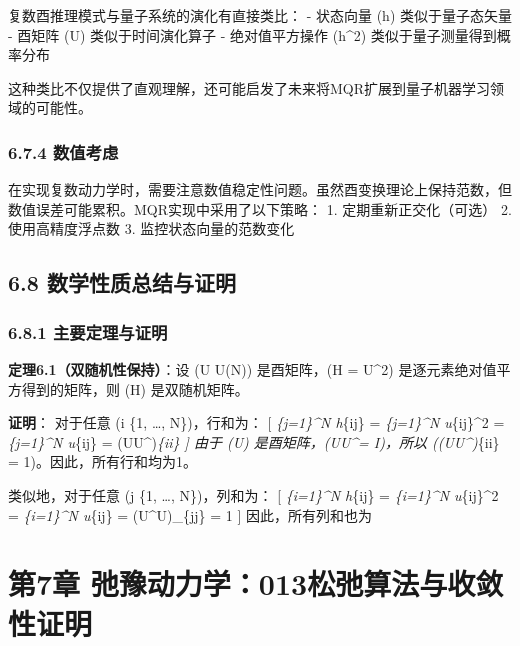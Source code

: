 \documentclass[
  12pt,
]{article}
\begin{document}
复数酉推理模式与量子系统的演化有直接类比： - 状态向量 (h)
类似于量子态矢量 - 酉矩阵 (U) 类似于时间演化算子 - 绝对值平方操作
(\textbar h\textbar\^{}2) 类似于量子测量得到概率分布

这种类比不仅提供了直观理解，还可能启发了未来将MQR扩展到量子机器学习领域的可能性。

\hypertarget{ux6570ux503cux8003ux8651}{%
\subsubsection{6.7.4 数值考虑}\label{ux6570ux503cux8003ux8651}}

在实现复数动力学时，需要注意数值稳定性问题。虽然酉变换理论上保持范数，但数值误差可能累积。MQR实现中采用了以下策略：
1. 定期重新正交化（可选） 2. 使用高精度浮点数 3. 监控状态向量的范数变化

\hypertarget{ux6570ux5b66ux6027ux8d28ux603bux7ed3ux4e0eux8bc1ux660e}{%
\subsection{6.8
数学性质总结与证明}\label{ux6570ux5b66ux6027ux8d28ux603bux7ed3ux4e0eux8bc1ux660e}}

\hypertarget{ux4e3bux8981ux5b9aux7406ux4e0eux8bc1ux660e}{%
\subsubsection{6.8.1
主要定理与证明}\label{ux4e3bux8981ux5b9aux7406ux4e0eux8bc1ux660e}}

\textbf{定理6.1（双随机性保持）}：设 (U \in U(N)) 是酉矩阵，(H =
\textbar U\textbar\^{}2) 是逐元素绝对值平方得到的矩阵，则 (H)
是双随机矩阵。

\textbf{证明}： 对于任意 (i \in \{1, \ldots, N\})，行和为： {[}
\sum\emph{\{j=1\}\^{}N h}\{ij\} = \sum\emph{\{j=1\}\^{}N
\textbar u}\{ij\}\textbar\^{}2 = \sum\emph{\{j=1\}\^{}N u}\{ij\}
 = (UU\^{}\dagger)\emph{\{ii\} {]} 由于 (U)
是酉矩阵，(UU\^{}\dagger = I)，所以 ((UU\^{}\dagger)}\{ii\} =
1)。因此，所有行和均为1。

类似地，对于任意 (j \in \{1, \ldots, N\})，列和为： {[}
\sum\emph{\{i=1\}\^{}N h}\{ij\} = \sum\emph{\{i=1\}\^{}N
\textbar u}\{ij\}\textbar\^{}2 = \sum\emph{\{i=1\}\^{}N u}\{ij\}
 = (U\^{}\dagger U)\_\{jj\} = 1 {]} 因此，所有列和也为

\hypertarget{ux7b2c7ux7ae0-ux5f1bux8c6bux52a8ux529bux5b66013ux677eux5f1bux7b97ux6cd5ux4e0eux6536ux655bux6027ux8bc1ux660e}{%
\section{第7章
弛豫动力学：013松弛算法与收敛性证明}\label{ux7b2c7ux7ae0-ux5f1bux8c6bux52a8ux529bux5b66013ux677eux5f1bux7b97ux6cd5ux4e0eux6536ux655bux6027ux8bc1ux660e}}
\end{document}
